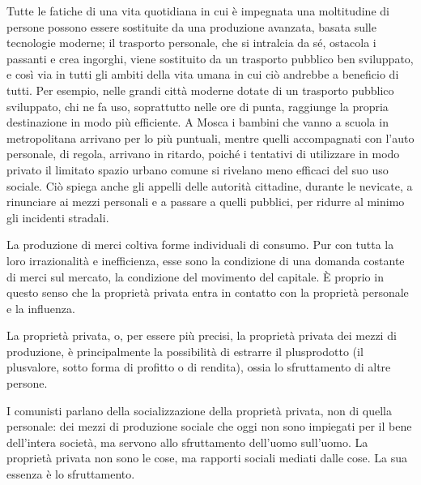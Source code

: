 \documentclass[12pt,a4paper,openany]{book}
\begin{document}
Tutte le fatiche di una vita quotidiana in cui è impegnata una moltitudine di persone possono essere sostituite da una produzione avanzata, basata sulle tecnologie moderne; il trasporto personale, che si intralcia da sé, ostacola i passanti e crea ingorghi, viene sostituito da un trasporto pubblico ben sviluppato, e così via in tutti gli ambiti della vita umana in cui ciò andrebbe a beneficio di tutti. Per esempio, nelle grandi città moderne dotate di un trasporto pubblico sviluppato, chi ne fa uso, soprattutto nelle ore di punta, raggiunge la propria destinazione in modo più efficiente. A Mosca i bambini che vanno a scuola in metropolitana arrivano per lo più puntuali, mentre quelli accompagnati con l'auto personale, di regola, arrivano in ritardo, poiché i tentativi di utilizzare in modo privato il limitato spazio urbano comune si rivelano meno efficaci del suo uso sociale. Ciò spiega anche gli appelli delle autorità cittadine, durante le nevicate, a rinunciare ai mezzi personali e a passare a quelli pubblici, per ridurre al minimo gli incidenti stradali.

La produzione di merci coltiva forme individuali di consumo. Pur con tutta la loro irrazionalità e inefficienza, esse sono la condizione di una domanda costante di merci sul mercato, la condizione del movimento del capitale. È proprio in questo senso che la proprietà privata entra in contatto con la proprietà personale e la influenza.

La proprietà privata, o, per essere più precisi, la proprietà privata dei mezzi di produzione, è principalmente la possibilità di estrarre il plusprodotto (il plusvalore, sotto forma di profitto o di rendita), ossia lo sfruttamento di altre persone.

I comunisti parlano della socializzazione della proprietà privata, non di quella personale: dei mezzi di produzione sociale che oggi non sono impiegati per il bene dell'intera società, ma servono allo sfruttamento dell'uomo sull'uomo. La proprietà privata non sono le cose, ma rapporti sociali mediati dalle cose. La sua essenza è lo sfruttamento.
\end{document}
